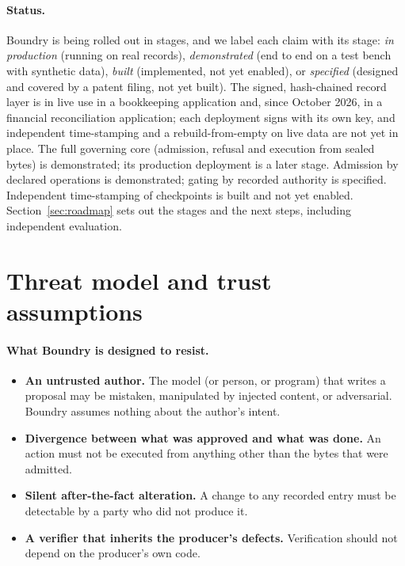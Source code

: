 \documentclass[11pt,a4paper]{article}
\begin{document}
\paragraph{Status.} Boundry is being rolled out in stages, and we label each claim with its stage: \emph{in production} (running on real records), \emph{demonstrated} (end to end on a test bench with synthetic data), \emph{built} (implemented, not yet enabled), or \emph{specified} (designed and covered by a patent filing, not yet built). The signed, hash-chained record layer is in live use in a bookkeeping application and, since October 2026, in a financial reconciliation application; each deployment signs with its own key, and independent time-stamping and a rebuild-from-empty on live data are not yet in place. The full governing core (admission, refusal and execution from sealed bytes) is demonstrated; its production deployment is a later stage. Admission by declared operations is demonstrated; gating by recorded authority is specified. Independent time-stamping of checkpoints is built and not yet enabled. Section~\ref{sec:roadmap} sets out the stages and the next steps, including independent evaluation.

\section{Threat model and trust assumptions}\label{sec:threat}

\paragraph{What Boundry is designed to resist.}
\begin{itemize}
  \item \textbf{An untrusted author.} The model (or person, or program) that writes a proposal may be mistaken, manipulated by injected content, or adversarial. Boundry assumes nothing about the author's intent.
  \item \textbf{Divergence between what was approved and what was done.} An action must not be executed from anything other than the bytes that were admitted.
  \item \textbf{Silent after-the-fact alteration.} A change to any recorded entry must be detectable by a party who did not produce it.
  \item \textbf{A verifier that inherits the producer's defects.} Verification should not depend on the producer's own code.
\end{itemize}
\end{document}
